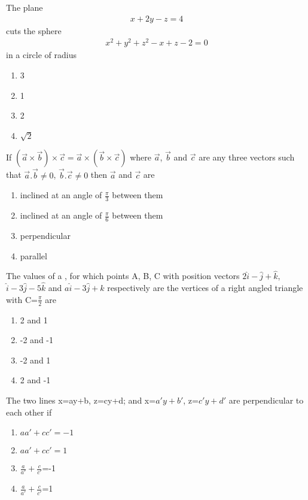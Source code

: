 \item The plane 
\begin{align*}
x+2y-z=4
\end{align*}
cuts the sphere
\begin{align}
x^2+y^2+z^2-x+z-2=0
\end{align}
in a circle of radius
\begin{enumerate}
\item 3
\item 1
\item 2
\item $\sqrt{2}$
\end{enumerate}

\item If $(\overrightarrow{a} \times \overrightarrow{b}) \times \overrightarrow{c}=\overrightarrow{a} \times (\overrightarrow{b} \times \overrightarrow{c})$ where $\overrightarrow{a}$, $\overrightarrow{b}$ and $\overrightarrow{c}$ are any three vectors such that $\overrightarrow{a}.\overrightarrow{b} \neq 0$, $\overrightarrow{b}.\overrightarrow{c} \neq 0$ then $\overrightarrow{a}$ and $\overrightarrow{c}$ are
\begin{enumerate}
\item inclined at an angle of $\frac{\pi}{3}$ between them
\item inclined at an angle of $\frac{\pi}{6}$ between them
\item perpendicular
\item parallel
\end{enumerate}

\item The values of a , for which points A, B, C with position vectors $2\hat{i}-\hat{j}+\hat{k}$, $\hat{i}-3\hat{j}-5\hat{k}$ and $a\hat{i}-3\hat{j}+\hat{k}$ respectively are the vertices of a right angled triangle with C=$\frac{\pi}{2}$ are
\begin{enumerate}
\item 2 and 1
\item -2 and -1
\item -2 and 1
\item 2 and -1
\end{enumerate}

\item The two lines x=ay+b, z=cy+d; and x=$a'y+b'$, z=$c'y+d'$ are perpendicular to each other if
\begin{enumerate}
\item $aa'+cc'=-1$
\item $aa'+cc'=1$
\item $\frac{a}{a'}+\frac{c}{c'}$=-1
\item $\frac{a}{a'}+\frac{c}{c'}$=1
\end{enumerate}

